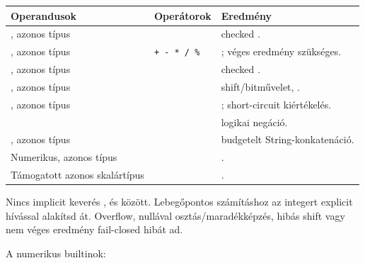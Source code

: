 \begin{center}
\begin{tabularx}{\textwidth}{@{}l l Y@{}}
\toprule
\textbf{Operandusok} & \textbf{Operátorok} & \textbf{Eredmény} \\
\midrule
{}, azonos típus & \code{+ - * / \%} & checked . \\
, azonos típus & \texttt{+ - * / \%} & ; véges eredmény szükséges. \\
, azonos típus & \code{+ - * / \%} & checked . \\
, azonos típus & \code{<< >> \& \^{} |} & shift/bitművelet, . \\
, azonos típus & \code{\&\& ||} & ; short-circuit kiértékelés. \\
 & \code{!} & logikai negáció. \\
, azonos típus & \code{+} & budgetelt String-konkatenáció. \\
Numerikus, azonos típus & \code{< <= > >=} & . \\
Támogatott azonos skalártípus & \code{== !=} & . \\
\bottomrule
\end{tabularx}
\end{center}

Nincs implicit keverés ,  és  között. Lebegőpontos számításhoz az integert explicit  hívással alakítsd át. Overflow, nullával osztás/maradékképzés, hibás shift vagy nem véges  eredmény fail-closed hibát ad.

A numerikus builtinok:

